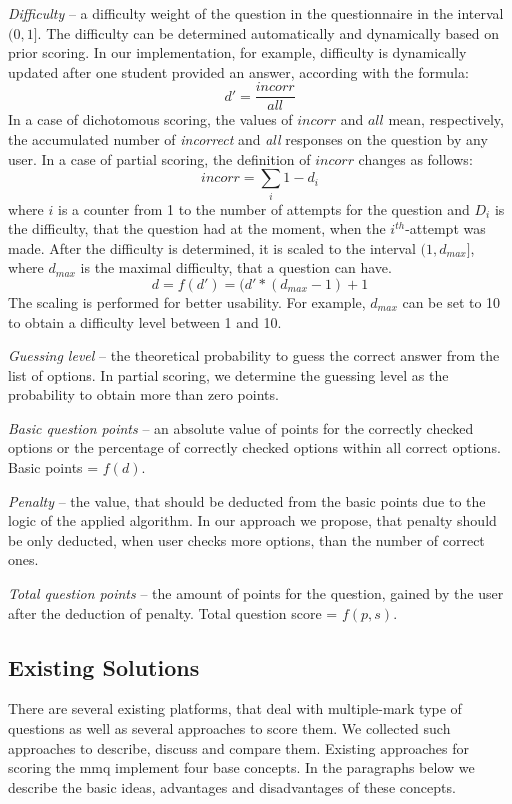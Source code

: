 \documentclass[PhD, Submit, ngerman,UKenglish,table]{scrbook}
\begin{document}
\textit{Difficulty} -- a difficulty weight of the question in the questionnaire in the interval $(0,1]$.
The difficulty can be determined automatically and dynamically based on prior scoring.
In our implementation, for example, difficulty is dynamically updated after one student provided an answer, according with the formula: 
	\[d' = \frac{incorr}{all}\]
In a case of dichotomous scoring, the values of $incorr$ and $all$ mean, respectively, the accumulated number of \textit{incorrect} and \textit{all} responses on the question by any user.
In a case of partial scoring, the definition of $incorr$ changes as follows:
	\[incorr = \sum_{i}1-d_{i}\]
where $i$ is a counter from 1 to the number of attempts for the question and
$D_{i}$ is the difficulty, that the question had at the moment, when the $i^{th}$-attempt was made.
After the difficulty is determined, it is scaled to the interval $(1,d_{max}]$, where $d_{max}$ is the maximal difficulty, that a question can have.
	\[d = f(d') = (d' *(d_{max}-1)+1 \]
The scaling is performed for better usability.
For example, $d_{max}$ can be set to 10 to obtain a difficulty level between 1 and 10.

\textit{Guessing level} -- the theoretical probability to guess the correct answer from the list of options.
In partial scoring, we determine the guessing level as the probability to obtain more than zero points.

\textit{Basic question points} -- an absolute value of points for the correctly checked options or the percentage of correctly checked options within all correct options.
Basic points = $f(d)$.

\textit{Penalty} -- the value, that should be deducted from the basic points due to the logic of the applied algorithm.
		In our approach we propose, that penalty should be only deducted, when user checks more options, than the number of correct ones.

\textit{Total question points} -- the amount of points for the question, gained by the user after the deduction of penalty.
		Total question score = $f(p,s)$.

\subsection{Existing Solutions}

There are several existing platforms, that deal with multiple-mark type of questions as well as several approaches to score them. 
We collected such approaches to describe, discuss and compare them.
Existing approaches for scoring the \gls{mmq} implement four base concepts.
In the paragraphs below we describe the basic ideas, advantages and disadvantages of these concepts.
\end{document}
